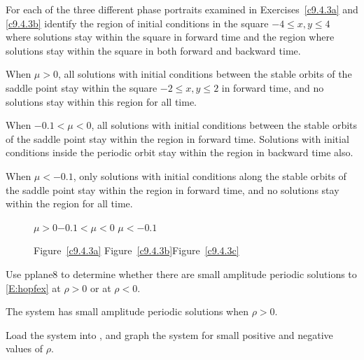 \documentclass{ximera}
\begin{document}
\begin{exercise} \label{c9.4.3c}
For each of the three different phase portraits examined in 
Exercises~\ref{c9.4.3a} and \ref{c9.4.3b} identify the region of initial 
conditions in the square $-4\leq x,y \leq 4$ where solutions stay within the 
square in forward time and the region where solutions stay within the square 
in both forward and backward time.

\begin{solution}

When $\mu > 0$, all solutions with initial conditions between the
stable orbits of the saddle point stay within the square $-2 \leq
x,y \leq 2$ in forward time, and no solutions stay within this region
for all time.

\para When $-0.1 < \mu < 0$, all solutions with initial
conditions between the stable orbits of the saddle point stay within the
region in forward time.  Solutions with initial conditions inside the
periodic orbit stay within the region in backward time also.

\para When $\mu < -0.1$, only solutions with initial conditions along the
stable orbits of the saddle point stay within the region in forward time,
and no solutions stay within the region for all time.

\begin{figure}[htb]
                       \centerline{%
                       }
		\centerline{$\mu > 0$\hspace{1.2in}$-0.1 < \mu < 0$
\hspace{1.2in}$\mu < -0.1$}
		\centerline{Figure~\ref{c9.4.3a}\hspace{1.2in}
Figure~\ref{c9.4.3b}\hspace{1.2in}Figure~\ref{c9.4.3c}}
\end{figure}

\end{solution}
\end{exercise}

\begin{exercise} \label{c9.4.4}
Use {\sf pplane8} to determine whether there are small amplitude periodic 
solutions to \eqref{E:hopfex} at $\rho>0$ or at $\rho<0$.

\begin{solution}

\ans The system has small amplitude periodic solutions when $\rho > 0$.

\soln Load the system into \Matlab, and graph the
system for small positive and negative values of $\rho$.





\end{solution}
\end{exercise}
\end{document}
